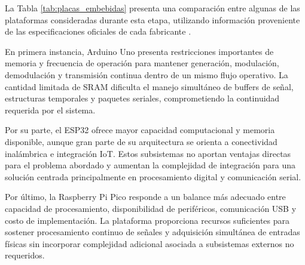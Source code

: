 La Tabla \ref{tab:placas_embebidas} presenta una comparación entre algunas de las plataformas consideradas durante esta etapa, utilizando información proveniente de las especificaciones oficiales de cada fabricante \cite{raspberrypiPicoDocs}.

\begin{table}[H]
\centering
\caption{Comparación entre plataformas embebidas consideradas.}
\label{tab:placas_embebidas}
\end{table}

En primera instancia, Arduino Uno presenta restricciones importantes de memoria y frecuencia de operación para mantener generación, modulación, demodulación y transmisión continua dentro de un mismo flujo operativo. La cantidad limitada de SRAM dificulta el manejo simultáneo de buffers de señal, estructuras temporales y paquetes seriales, comprometiendo la continuidad requerida por el sistema.

Por su parte, el ESP32 ofrece mayor capacidad computacional y memoria disponible, aunque gran parte de su arquitectura se orienta a conectividad inalámbrica e integración IoT. Estos subsistemas no aportan ventajas directas para el problema abordado y aumentan la complejidad de integración para una solución centrada principalmente en procesamiento digital y comunicación serial.

Por último, la Raspberry Pi Pico responde a un balance más adecuado entre capacidad de procesamiento, disponibilidad de periféricos, comunicación USB y costo de implementación. La plataforma proporciona recursos suficientes para sostener procesamiento continuo de señales y adquisición simultánea de entradas físicas sin incorporar complejidad adicional asociada a subsistemas externos no requeridos.

